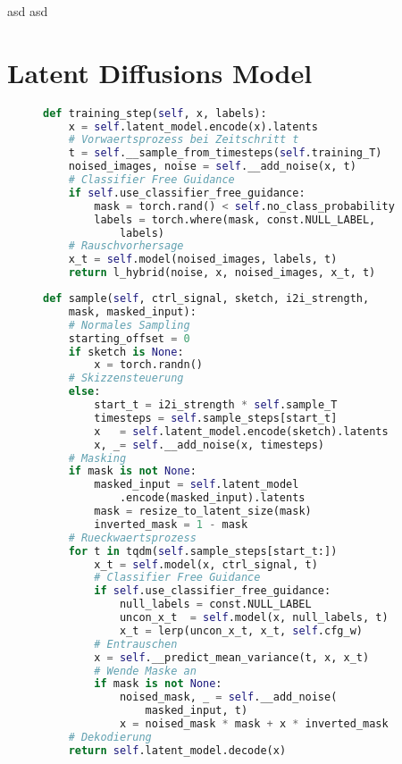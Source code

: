 asd
asd

\section {Latent Diffusions Model}

\begin{figure}[htbp]
\begin{lstlisting}[language=python]
def training_step(self, x, labels):
    x = self.latent_model.encode(x).latents
    # Vorwaertsprozess bei Zeitschritt t
    t = self.__sample_from_timesteps(self.training_T)
    noised_images, noise = self.__add_noise(x, t)
    # Classifier Free Guidance
    if self.use_classifier_free_guidance: 
        mask = torch.rand() < self.no_class_probability
        labels = torch.where(mask, const.NULL_LABEL, 
            labels)   
    # Rauschvorhersage
    x_t = self.model(noised_images, labels, t)
    return l_hybrid(noise, x, noised_images, x_t, t)
\end{lstlisting}
    \captionsetup{type=figure}
    \label{fig:ldm_training}
\end{figure}

\begin{figure}[htbp]
\begin{lstlisting}[language=python]
def sample(self, ctrl_signal, sketch, i2i_strength,
    mask, masked_input):
    # Normales Sampling
    starting_offset = 0
    if sketch is None:
        x = torch.randn()
    # Skizzensteuerung
    else:
        start_t = i2i_strength * self.sample_T
        timesteps = self.sample_steps[start_t]
        x   = self.latent_model.encode(sketch).latents
        x, _= self.__add_noise(x, timesteps)
    # Masking 
    if mask is not None:
        masked_input = self.latent_model
            .encode(masked_input).latents
        mask = resize_to_latent_size(mask)
        inverted_mask = 1 - mask
    # Rueckwaertsprozess
    for t in tqdm(self.sample_steps[start_t:])  
        x_t = self.model(x, ctrl_signal, t)
        # Classifier Free Guidance 
        if self.use_classifier_free_guidance:       
            null_labels = const.NULL_LABEL
            uncon_x_t  = self.model(x, null_labels, t)
            x_t = lerp(uncon_x_t, x_t, self.cfg_w)
        # Entrauschen
        x = self.__predict_mean_variance(t, x, x_t)        
        # Wende Maske an
        if mask is not None:
            noised_mask, _ = self.__add_noise(
                masked_input, t) 
            x = noised_mask * mask + x * inverted_mask
    # Dekodierung 
    return self.latent_model.decode(x)
\end{lstlisting}
    \captionsetup{type=figure}
    \label{fig:ldm_sample}
\end{figure}


